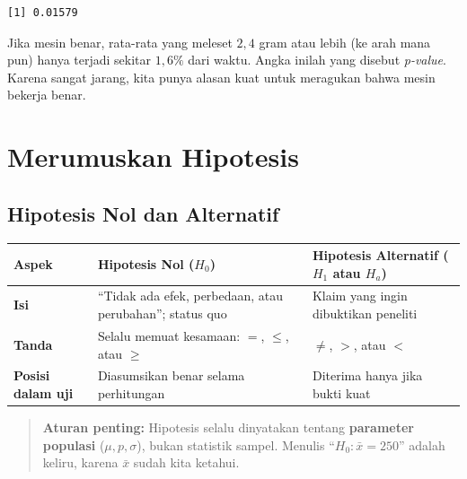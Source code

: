 \documentclass[
  indonesian,
  letterpaper,
]{book}
\newcounter{none} %
\begin{document}
\begin{verbatim}
[1] 0.01579
\end{verbatim}

Jika mesin benar, rata-rata yang meleset \(2{,}4\) gram atau lebih (ke
arah mana pun) hanya terjadi sekitar \(1{,}6\%\) dari waktu. Angka
inilah yang disebut \emph{p-value}. Karena sangat jarang, kita punya
alasan kuat untuk meragukan bahwa mesin bekerja benar.

\section{Merumuskan Hipotesis}\label{merumuskan-hipotesis}

\subsection{Hipotesis Nol dan
Alternatif}\label{hipotesis-nol-dan-alternatif}

{\def\LTcaptype{none} %
\begin{longtable}[]{@{}
  >{\raggedright\arraybackslash}p{}
  >{\raggedright\arraybackslash}p{}
  >{\raggedright\arraybackslash}p{}@{}}
\toprule\noalign{}
\begin{minipage}[b]{\linewidth}\raggedright
Aspek
\end{minipage} & \begin{minipage}[b]{\linewidth}\raggedright
Hipotesis Nol (\(H_0\))
\end{minipage} & \begin{minipage}[b]{\linewidth}\raggedright
Hipotesis Alternatif (\(H_1\) atau \(H_a\))
\end{minipage} \\
\midrule\noalign{}
\endhead
\bottomrule\noalign{}
\endlastfoot
\textbf{Isi} & ``Tidak ada efek, perbedaan, atau perubahan''; status quo
& Klaim yang ingin dibuktikan peneliti \\
\textbf{Tanda} & Selalu memuat kesamaan: \(=\), \(\le\), atau \(\ge\) &
\(\ne\), \(>\), atau \(<\) \\
\textbf{Posisi dalam uji} & Diasumsikan benar selama perhitungan &
Diterima hanya jika bukti kuat \\
\end{longtable}
}

\begin{quote}
\textbf{Aturan penting:} Hipotesis selalu dinyatakan tentang
\textbf{parameter populasi} (\(\mu, p, \sigma\)), bukan statistik
sampel. Menulis ``\(H_0: \bar{x} = 250\)'' adalah keliru, karena
\(\bar{x}\) sudah kita ketahui.
\end{quote}
\end{document}
